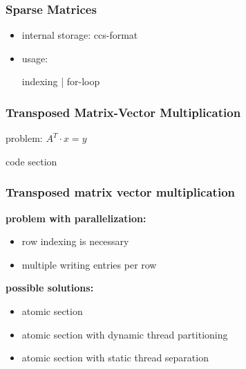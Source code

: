 \documentclass{beamer}
\begin{document}

\begin{frame}
\frametitle{Sparse Matrices}
\begin{itemize}
\item internal storage: ccs-format
\item usage:
\begin{block}{indexing | for-loop}
\codeA
\end{block}
\end{itemize}
\end{frame}



\begin{frame}
\frametitle{Transposed Matrix-Vector Multiplication}
problem: $A^T\cdot x=y$
\begin{block}{code section}
\codeB
\end{block}
\end{frame}


\begin{frame}
\frametitle{Transposed matrix vector multiplication}
\textbf{problem with parallelization:}
\begin{itemize}
\item row indexing is necessary
\item multiple writing entries per row
\end{itemize}

\textbf{possible solutions:}
\begin{itemize}
\item atomic section
\item atomic section with dynamic thread partitioning \codeC
\item atomic section with static thread separation
\end{itemize}
\end{frame}
\end{document}

